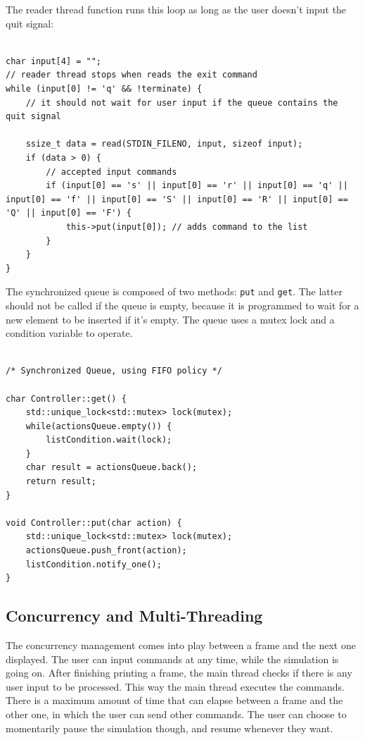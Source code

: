 \documentclass[10pt]{article}
\begin{document}
The reader thread function runs this loop as long as the user doesn't input the quit signal:
\begin{verbatim}

char input[4] = "";
// reader thread stops when reads the exit command
while (input[0] != 'q' && !terminate) {
	// it should not wait for user input if the queue contains the quit signal

	ssize_t data = read(STDIN_FILENO, input, sizeof input);
	if (data > 0) {
		// accepted input commands
		if (input[0] == 's' || input[0] == 'r' || input[0] == 'q' || input[0] == 'f' || input[0] == 'S' || input[0] == 'R' || input[0] == 'Q' || input[0] == 'F') {
			this->put(input[0]); // adds command to the list
		}
	}
}

\end{verbatim}

The synchronized queue is composed of two methods: \verb|put| and \verb|get|. The latter should not be called if the queue is empty, because it is programmed to
wait for a new element to be inserted if it's empty. The queue uses a mutex lock and a condition variable to operate.

\begin{verbatim}

/* Synchronized Queue, using FIFO policy */

char Controller::get() {
	std::unique_lock<std::mutex> lock(mutex);
	while(actionsQueue.empty()) {
		listCondition.wait(lock);
	}
	char result = actionsQueue.back();
	return result;
}

void Controller::put(char action) {
	std::unique_lock<std::mutex> lock(mutex);
	actionsQueue.push_front(action);
	listCondition.notify_one();
}

\end{verbatim}

\subsection{Concurrency and Multi-Threading}

The concurrency management comes into play between a frame and the next one displayed. The user can input commands at any time, while the simulation is going on.
After finishing printing a frame, the main thread checks if there is any user input to be processed. This way the main thread executes the commands. 
There is a maximum amount of time that can elapse between a frame and the other one, in which the user can send other commands. The user can choose to 
momentarily pause the simulation though, and resume whenever they want.
\end{document}
